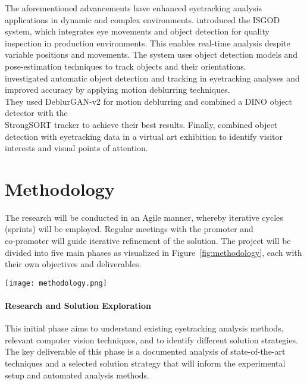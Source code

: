 \documentclass[english]{hogent-article}
\begin{document}
The aforementioned advancements have enhanced eyetracking analysis applications in dynamic and complex environments.
\textcite{Cho2024} introduced the ISGOD system, which integrates eye movements and object detection for quality inspection in production 
environments. This enables real-time analysis despite variable positions and movements. 
The system uses object detection models and pose-estimation techniques to track objects and their orientations.\\
\textcite{Cederin2023} investigated automatic object detection and tracking in eyetracking analyses and improved accuracy by applying motion deblurring techniques.\\ 
They used DeblurGAN-v2 for motion deblurring and combined a DINO object detector with the\\ StrongSORT tracker to achieve their best results.
Finally, \textcite{Kulyk2023} combined object detection with eyetracking data in a virtual art exhibition to identify visitor interests and visual points of attention.

\section{Methodology}
\label{sec:methodology}

The research will be conducted in an Agile manner, whereby iterative cycles (sprints) will be employed.
Regular meetings with the promoter and\\ co-promoter will guide iterative refinement of the solution.
The project will be divided into five main phases as visualized in Figure~\ref{fig:methodology}, each with their own objectives and deliverables.

\begin{figure*}
  \centering
  \texttt{[image: methodology.png]}
  \caption{Overview of the project phases, their deliverables, and the relationships between them.}
  \label{fig:methodology}
\end{figure*}

\paragraph{Research and Solution Exploration\\}
This initial phase aims to understand existing eyetracking analysis methods, 
relevant computer vision techniques, and to identify different solution strategies. 
The key deliverable of this phase is a documented analysis of state-of-the-art techniques and a selected solution strategy 
that will inform the experimental setup and automated analysis methods.
\end{document}
